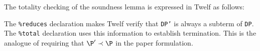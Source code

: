 \Twelf
The totality checking of the soundness lemma is expressed in Twelf as follows:

The \texttt{\%reduces} declaration makes Twelf verify that \texttt{DP'} is always a subterm of \texttt{DP}.
The \texttt{\%total} declaration uses this information to establish termination.
This is the analogue of requiring that $\P' \prec \P$ in the paper formulation.

